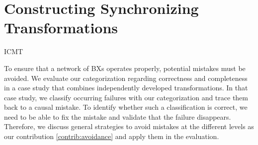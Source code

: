 \chapter{Constructing Synchronizing Transformations
}
\label{chap:synchronization}


\begin{copiedFrom}{ICMT}

To ensure that a network of \acp{BX} operates properly, potential mistakes %
must be avoided.
We evaluate our categorization regarding correctness and completeness %
in a case study that combines independently developed transformations.
In that case study, we classify occurring failures with our categorization and trace them back to a causal mistake.
To identify whether such a classification is correct, we need to be able to fix the mistake and validate that the failure disappears.
Therefore, we discuss general strategies to avoid mistakes at the different levels as our contribution \ref{contrib:avoidance} and apply them in the evaluation.


\end{copiedFrom}
